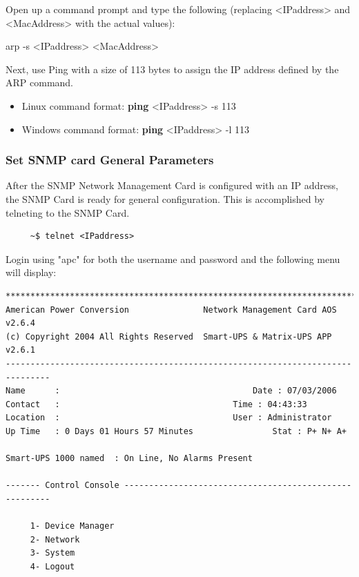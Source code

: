 {{{{{{{Open up a command prompt and type the following (replacing <IPaddress> and <MacAddress>
with the actual values):

arp -s <IPaddress> <MacAddress>

Next, use Ping with a size of 113 bytes to assign the IP address defined by the ARP
command.

\begin{itemize}
\item Linux command format:   {\bf ping} <IPaddress> -s 113
\item Windows command format: {\bf ping} <IPaddress> -l 113
\end{itemize}


\subsubsection*{Set SNMP card General Parameters}
After the SNMP Network Management Card is configured with an IP address, the SNMP Card
is ready for general configuration.  This is accomplished by telneting to the SNMP Card.

\footnotesize
\begin{verbatim}
     ~$ telnet <IPaddress>
\end{verbatim}
\normalsize

Login using "apc" for both the username and password and the following menu will display:





\footnotesize
\begin{verbatim}
*******************************************************************************
American Power Conversion               Network Management Card AOS      v2.6.4
(c) Copyright 2004 All Rights Reserved  Smart-UPS & Matrix-UPS APP       v2.6.1
-------------------------------------------------------------------------------
Name      : 	 	                              Date : 07/03/2006	       
Contact   :     		                      Time : 04:43:33
Location  : 			                      User : Administrator
Up Time   : 0 Days 01 Hours 57 Minutes                Stat : P+ N+ A+

Smart-UPS 1000 named  : On Line, No Alarms Present

------- Control Console -------------------------------------------------------

     1- Device Manager
     2- Network
     3- System
     4- Logout


\end{verbatim}}}}}}}}
